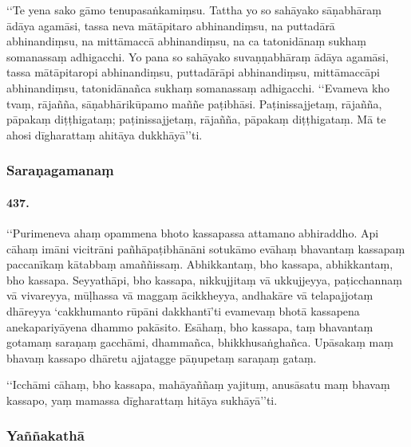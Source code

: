 ‘‘Te yena sako gāmo tenupasaṅkamiṃsu. Tattha yo so sahāyako sāṇabhāraṃ ādāya agamāsi, tassa neva mātāpitaro abhinandiṃsu, na puttadārā abhinandiṃsu, na mittāmaccā abhinandiṃsu, na ca tatonidānaṃ sukhaṃ somanassaṃ adhigacchi. Yo pana so sahāyako suvaṇṇabhāraṃ ādāya agamāsi, tassa mātāpitaropi abhinandiṃsu, puttadārāpi abhinandiṃsu, mittāmaccāpi abhinandiṃsu, tatonidānañca sukhaṃ somanassaṃ adhigacchi. ‘‘Evameva kho tvaṃ, rājañña, sāṇabhārikūpamo maññe paṭibhāsi. Paṭinissajjetaṃ, rājañña, pāpakaṃ diṭṭhigataṃ; paṭinissajjetaṃ, rājañña, pāpakaṃ diṭṭhigataṃ. Mā te ahosi dīgharattaṃ ahitāya dukkhāyā’’ti.

\subsubsection{Saraṇagamanaṃ}

\paragraph{437.} ‘‘Purimeneva ahaṃ opammena bhoto kassapassa attamano abhiraddho. Api cāhaṃ imāni vicitrāni pañhāpaṭibhānāni sotukāmo evāhaṃ bhavantaṃ kassapaṃ paccanīkaṃ kātabbaṃ amaññissaṃ. Abhikkantaṃ, bho kassapa, abhikkantaṃ, bho kassapa. Seyyathāpi, bho kassapa, nikkujjitaṃ vā ukkujjeyya, paṭicchannaṃ vā vivareyya, mūḷhassa vā maggaṃ ācikkheyya, andhakāre vā telapajjotaṃ dhāreyya ‘cakkhumanto rūpāni dakkhantī’ti evamevaṃ bhotā kassapena anekapariyāyena dhammo pakāsito. Esāhaṃ, bho kassapa, taṃ bhavantaṃ gotamaṃ saraṇaṃ gacchāmi, dhammañca, bhikkhusaṅghañca. Upāsakaṃ maṃ bhavaṃ kassapo dhāretu ajjatagge pāṇupetaṃ saraṇaṃ gataṃ.

‘‘Icchāmi cāhaṃ, bho kassapa, mahāyaññaṃ yajituṃ, anusāsatu maṃ bhavaṃ kassapo, yaṃ mamassa dīgharattaṃ hitāya sukhāyā’’ti.

\subsubsection{Yaññakathā}

